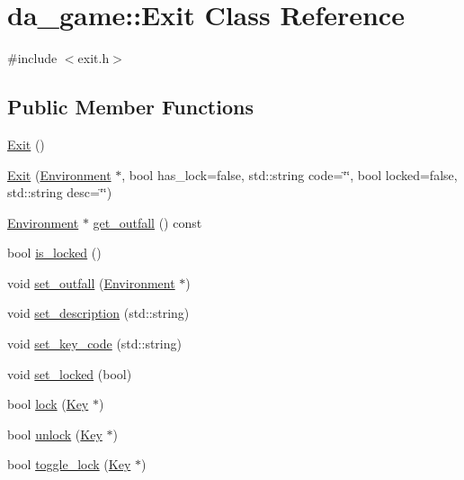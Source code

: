 \hypertarget{classda__game_1_1Exit}{
\section{da\_\-game::Exit Class Reference}
\label{classda__game_1_1Exit}
}


{\ttfamily \#include $<$exit.h$>$}\subsection*{Public Member Functions}
\begin{DoxyCompactItemize}
\item 
\hyperlink{classda__game_1_1Exit_aaacef438c545390f01c5bf1c6072d43e}{Exit} ()
\item 
\hyperlink{classda__game_1_1Exit_ae6a2d9ab456888b9c5aa7e23539b2827}{Exit} (\hyperlink{classda__game_1_1Environment}{Environment} $\ast$, bool has\_\-lock=false, std::string code=\char`\"{}\char`\"{}, bool locked=false, std::string desc=\char`\"{}\char`\"{})
\item 
\hyperlink{classda__game_1_1Environment}{Environment} $\ast$ \hyperlink{classda__game_1_1Exit_ad4f4951039d5d7ca57fce2120e8390f4}{get\_\-outfall} () const 
\item 
bool \hyperlink{classda__game_1_1Exit_a469187cf61ab5285b71ac4fb103f10b1}{is\_\-locked} ()
\item 
void \hyperlink{classda__game_1_1Exit_ae4f9caa0ac7bf7e09ae1b32fd3f10719}{set\_\-outfall} (\hyperlink{classda__game_1_1Environment}{Environment} $\ast$)
\item 
void \hyperlink{classda__game_1_1Exit_aef620aed29423172be98f0e2bc12db13}{set\_\-description} (std::string)
\item 
void \hyperlink{classda__game_1_1Exit_ad79677f119a5d06a6d4a9185c710ab73}{set\_\-key\_\-code} (std::string)
\item 
void \hyperlink{classda__game_1_1Exit_a48bfb84dc93e05cb9f43d9d87726b8f5}{set\_\-locked} (bool)
\item 
bool \hyperlink{classda__game_1_1Exit_a252eecd61a98bec46db93185745deff5}{lock} (\hyperlink{classda__game_1_1Key}{Key} $\ast$)
\item 
bool \hyperlink{classda__game_1_1Exit_a4e770f624717bb87b2ebd372eb71a09c}{unlock} (\hyperlink{classda__game_1_1Key}{Key} $\ast$)
\item 
bool \hyperlink{classda__game_1_1Exit_a36b7a9235fcb00bf2be0b3fbc5817310}{toggle\_\-lock} (\hyperlink{classda__game_1_1Key}{Key} $\ast$)
\end{DoxyCompactItemize}


